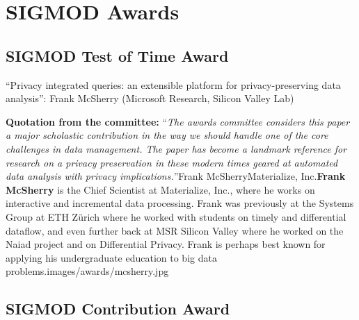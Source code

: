 
\newcommand{\personphoto}[1]{{\texttt{[image: \#1]}}}
\newcommand{\award}[2]{``#1'': #2}
\newcommand{\quot}[2]{{\vspace{2mm}\textbf{Quotation from the committee:} ``\emph{#1}''}}
\newcommand{\person}[4]{~\\~
\begin{minipage}{\textwidth}
\begin{wrapfigure}[8]{l}{2.15cm}
\vspace*{-1.2\baselineskip}%
\personphoto{#4}
\end{wrapfigure}
\emph{\small #3}
\end{minipage}
}

\section*{SIGMOD Awards}

\subsection*{SIGMOD Test of Time Award}

\award{Privacy integrated queries: an extensible platform for privacy-preserving data analysis}{Frank McSherry (Microsoft Research, Silicon Valley Lab)}

\quot{The awards committee considers this paper a major scholastic contribution
in the way we should handle one of the core challenges in  data management. The paper
has become a landmark reference for research on a privacy preservation in these modern
times geared at automated data analysis with privacy implications.}


\person{Frank McSherry}{Materialize, Inc.}{\textbf{Frank McSherry} is the Chief Scientist at Materialize, Inc., where he works on interactive and incremental data processing. Frank was previously at the Systems Group at ETH Z\"urich where he worked with students on timely and differential dataflow, and even further back at MSR Silicon Valley where he worked on the Naiad project and on Differential Privacy. Frank is perhaps best known for applying his undergraduate education to big data problems.}{images/awards/mcsherry.jpg}

\clearpage

\subsection*{SIGMOD Contribution Award}

